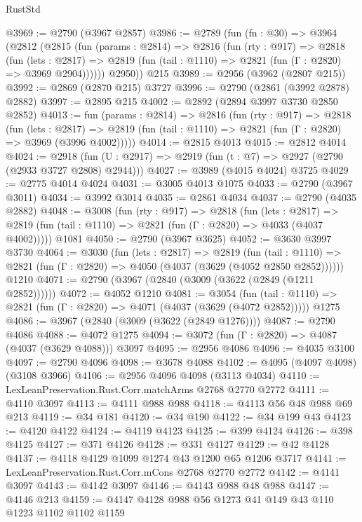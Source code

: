 \begin{lexlean}{RustStd}
\begin{coremodule}
@3969 := @2790 (@3967 @2857)
@3986 := @2789
    (fun (fn : @30) =>
    @3964
      (@2812
        (@2815
          (fun (params : @2814) =>
          @2816
            (fun (rty : @917) =>
            @2818
              (fun (lets : @2817) =>
              @2819 (fun (tail : @1110) => @2821 (fun (Γ : @2820) => @3969 @2904))))))
        @2950))
    @215
@3989 := @2956 (@3962 (@2807 @215))
@3992 := @2869 (@2870 @215) @3727
@3996 := @2790 (@2861 (@3992 @2878) @2882)
@3997 := @2895 @215
@4002 := @2892 (@2894 @3997 @3730 @2850 @2852)
@4013 := fun (params : @2814) =>
  @2816
    (fun (rty : @917) =>
    @2818
      (fun (lets : @2817) =>
      @2819 (fun (tail : @1110) => @2821 (fun (Γ : @2820) => @3969 (@3996 @4002)))))
@4014 := @2815 @4013
@4015 := @2812 @4014
@4024 := @2918 (fun (U : @2917) => @2919 (fun (t : @7) => @2927 (@2790 (@2933 @3727 @2808) @2944)))
@4027 := @3989 (@4015 @4024) @3725
@4029 := @2775 @4014 @4024
@4031 := @3005 @4013 @1075
@4033 := @2790 (@3967 @3011)
@4034 := @3992 @3014
@4035 := @2861 @4034
@4037 := @2790 (@4035 @2882)
@4048 := @3008
    (fun (rty : @917) =>
    @2818
      (fun (lets : @2817) =>
      @2819 (fun (tail : @1110) => @2821 (fun (Γ : @2820) => @4033 (@4037 @4002)))))
    @1081
@4050 := @2790 (@3967 @3625)
@4052 := @3630 @3997 @3730
@4064 := @3030
    (fun (lets : @2817) =>
    @2819
      (fun (tail : @1110) => @2821 (fun (Γ : @2820) => @4050 (@4037 (@3629 (@4052 @2850 @2852))))))
    @1210
@4071 := @2790 (@3967 (@2840 (@3009 (@3622 (@2849 (@1211 @2852))))))
@4072 := @4052 @1210
@4081 := @3054
    (fun (tail : @1110) => @2821 (fun (Γ : @2820) => @4071 (@4037 (@3629 (@4072 @2852)))))
    @1275
@4086 := @3967 (@2840 (@3009 (@3622 (@2849 @1276))))
@4087 := @2790 @4086
@4088 := @4072 @1275
@4094 := @3072 (fun (Γ : @2820) => @4087 (@4037 (@3629 @4088))) @3097
@4095 := @2956 @4086
@4096 := @4035 @3100
@4097 := @2790 @4096
@4098 := @3678 @4088
@4102 := @4095 (@4097 @4098) (@3108 @3966)
@4106 := @2956 @4096 @4098 (@3113 @4034)
@4110 := LexLeanPreservation.Rust.Corr.matchArms @2768 @2770 @2772
@4111 := @4110 @3097
@4113 := @4111 @988 @988
@4118 := @4113 @56 @48 @988 @69 @213
@4119 := @34 @181
@4120 := @34 @190
@4122 := @34 @199 @43
@4123 := @4120 @4122
@4124 := @4119 @4123
@4125 := @399 @4124
@4126 := @398 @4125
@4127 := @371 @4126
@4128 := @331 @4127
@4129 := @42 @4128
@4137 := @4118 @4129 @1099 @1274 @43 @1200 @65 @1206 @3717
@4141 := LexLeanPreservation.Rust.Corr.mCons @2768 @2770 @2772
@4142 := @4141 @3097
@4143 := @4142 @3097
@4146 := @4143 @988 @48 @988
@4147 := @4146 @213
@4159 := @4147 @4128 @988 @56 @1273 @41 @149 @43 @110 @1223 @1102 @1102 @1159

\end{coremodule}
\end{lexlean}
